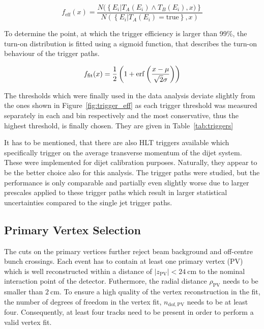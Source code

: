 \begin{equation}
\label{eq:trigger_eff}
    f_{\mathrm{eff}} (x) = \frac{N(\left\{E_i|T_A(E_i) \wedge T_B(E_i), x)\right\}}{N(\left\{ E_i | T_A(E_i) = \mathrm{true} \right\} , x)}
\end{equation}

To determine the point, at which the trigger efficiency is larger than 99\%, the
turn-on distribution is fitted using a sigmoid function, that describes the
turn-on behaviour of the trigger paths.

\begin{equation}
\label{eq:trigger_eff_fit}
    f_{\mathrm{fit}} (x) = \frac{1}{2} \left( 1 + \operatorname{erf} \left(\frac{x-\mu}{\sqrt{2}\sigma}\right)\right)
\end{equation}

The thresholds which were finally used in the data analysis deviate slightly
from the ones shown in Figure~\ref{fig:trigger_eff} as each trigger threshold
was measured separately in each \ystar and \yboost bin respectively and the most
conservative, thus the highest threshold, is finally chosen. They are given in
Table~\ref{tab:triggers}

It has to be mentioned, that there are also HLT triggers available which
specifically trigger on the average transverse momentum of the dijet system.
These were implemented for dijet calibration purposes. Naturally, they appear to
be the better choice also for this analysis. The \ptavg trigger paths were studied,
but the performance is only comparable and partially even slightly worse due to
larger prescales applied to these trigger paths which result in larger
statistical uncertainties compared to the single jet trigger paths.

\subsection{Primary Vertex Selection}

The cuts on the primary vertices further reject beam background and off-centre bunch
crossings. Each event has to contain at least one primary vertex (PV) which is well
reconstructed within a distance of $|z_\mathrm{PV}| < \SI{24}{\centi \meter}$ to
the nominal interaction point of the detector. Futhermore, the radial distance
$\rho_\mathrm{PV}$ needs to be smaller than $\SI{2}{\centi\meter}$. To
ensure a high quality of the vertex reconstruction in the fit, the number of
degrees of freedom in the vertex fit, $n_{\mathrm{dof,PV}}$ needs to be at least
four. Consequently, at least four tracks need to be present in order to
perform a valid vertex fit.

